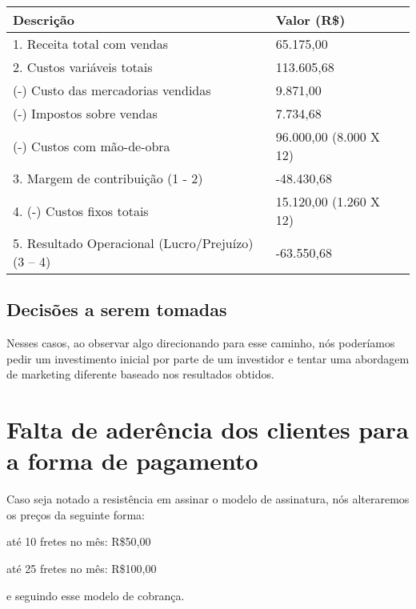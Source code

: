\begin{tabular}{| l | l | l |}
  \hline
  \textbf{Descrição} & \textbf{Valor (R\$)}\\ \hline
  1. Receita total com vendas & 65.175,00\\ \hline \hline
  2. Custos variáveis totais & 113.605,68\\ \hline
  (-) Custo das mercadorias vendidas & 9.871,00\\ \hline
  (-) Impostos sobre vendas & 7.734,68\\ \hline
  (-) Custos com mão-de-obra & 96.000,00 (8.000 X 12)\\ \hline \hline
  3. Margem de contribuição (1 - 2) & -48.430,68\\ \hline \hline
  4. (-) Custos fixos totais & 15.120,00 (1.260 X 12)\\ \hline \hline 
  5. Resultado Operacional (Lucro/Prejuízo) (3 – 4) & -63.550,68\\ \hline
\end{tabular}

\subsection{Decisões a serem tomadas}
Nesses casos, ao observar algo direcionando para esse caminho, nós poderíamos pedir um investimento inicial por parte de um investidor e tentar uma abordagem de marketing diferente baseado nos resultados obtidos.

\section{Falta de aderência dos clientes para a forma de pagamento}

Caso seja notado a resistência em assinar o modelo de assinatura, nós alteraremos os preços da seguinte forma:

até 10 fretes no mês: R\$50,00

até 25 fretes no mês: R\$100,00

e seguindo esse modelo de cobrança.

